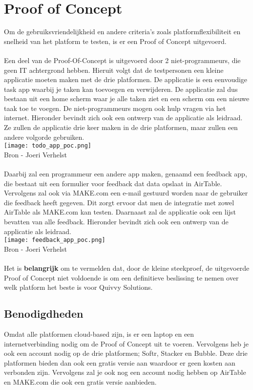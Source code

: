 \section*{Proof of Concept}
\label{sec:proof-of-concept}
Om de gebruiksvriendelijkheid en andere criteria's zoals platformflexibiliteit en snelheid van het platform te testen, is er een Proof of Concept uitgevoerd. 
\\
\\
Een deel van de Proof-Of-Concept is uitgevoerd door 2 niet-programmeurs, die geen IT achtergrond hebben. Hieruit volgt dat de testpersonen
een kleine applicatie moeten maken met de drie platformen. De applicatie is een eenvoudige task app waarbij je taken kan toevoegen en verwijderen.
De applicatie zal dus bestaan uit een home scherm waar je alle taken ziet en een scherm om een nieuwe taak toe te voegen. De niet-programmeurs mogen ook hulp vragen via het internet.
Hieronder bevindt zich ook een ontwerp van de applicatie als leidraad. Ze zullen de applicatie drie keer maken in de drie platformen, maar zullen een andere volgorde gebruiken.
\\
\texttt{[image: todo\_app\_poc.png]}
\\
Bron - Joeri Verhelst 
\\
\\
Daarbij zal een programmeur een andere app maken, genaamd een feedback app, die bestaat uit een formulier voor feedback dat data opslaat in AirTable.
Vervolgens zal ook via MAKE.com een e-mail gestuurd worden naar de gebruiker die feedback heeft gegeven.
Dit zorgt ervoor dat men de integratie met zowel AirTable als MAKE.com kan testen. Daarnaast zal de applicatie ook een lijst bevatten van alle feedback.
Hieronder bevindt zich ook een ontwerp van de applicatie als leidraad.
\\
\texttt{[image: feedback\_app\_poc.png]}
\\
Bron - Joeri Verhelst 
\\
\\
Het is \textbf{belangrijk} om te vermelden dat, door de kleine steekproef, de uitgevoerde Proof of Concept niet voldoende is om een 
definitieve beslissing te nemen over welk platform het beste is voor Quivvy Solutions.

\subsection*{Benodigdheden}
Omdat alle platformen cloud-based zijn, is er een laptop en een internetverbinding nodig om de Proof of Concept uit te voeren. Vervolgens heb je ook 
een account nodig op de drie platformen; Softr, Stacker en Bubble. Deze drie platformen bieden dan ook een gratis versie aan waardoor er geen kosten aan verbonden zijn. Vervolgens zal je ook 
nog een account nodig hebben op AirTable en MAKE.com die ook een gratis versie aanbieden.

